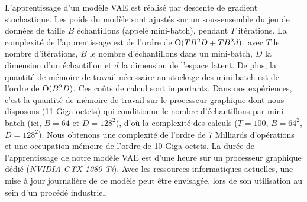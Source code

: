 L'apprentissage d'un modèle VAE est réalisé par descente de gradient stochastique.
Les poids du modèle sont ajustés sur un sous-ensemble du jeu de données de taille $B$ échantillons (appelé mini-batch), pendant $T$ itérations.
La complexité de l'apprentissage est de l'ordre de $\operatorname{O}(T B^2 D + T B^2 d)$, avec $T$ le nombre d'itérations, $B$ le nombre d'échantillons dans un mini-batch, $D$ la dimension d'un échantillon et $d$ la dimension de l'espace latent.
De plus, la quantité de mémoire de travail nécessaire au stockage des mini-batch est de l'ordre de  $\operatorname{O}(B^2 D)$.
Ces coûts de calcul sont importants.
Dans nos expériences, c'est la quantité de mémoire de travail sur le processeur graphique dont nous disposons (11 Giga octets) qui conditionne le nombre d'échantillons par mini-batch (ici, $B=64$ et $D=128^2$), d'où la complexité des calculs ($T=100$, $B=64^2$, $D=128^2$). Nous obtenons une complexité de l'ordre de 7 Milliards d'opérations et une occupation mémoire de l'ordre de 10 Giga octets.
La durée de l'apprentissage de notre modèle VAE est d'une heure sur un processeur graphique dédié (\textit{NVIDIA GTX 1080 Ti}).
Avec les ressources informatiques actuelles, une mise à jour journalière de ce modèle peut être envisagée, lors de son utilisation au sein d'un procédé industriel.



